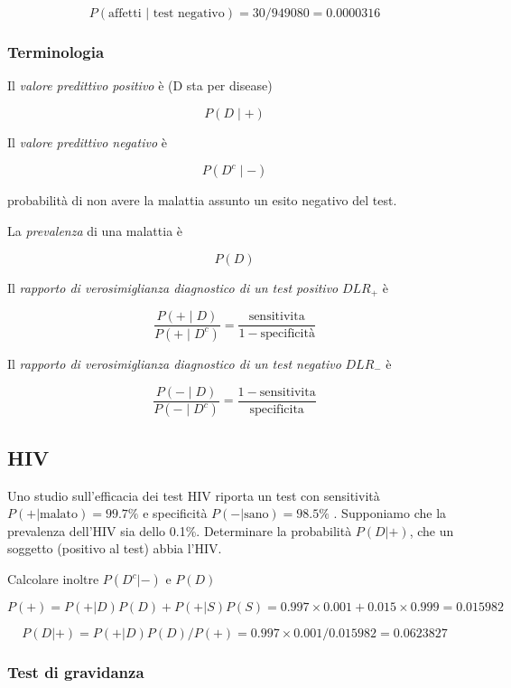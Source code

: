 \documentclass[onecolumn,12pt]{book}\usepackage[]{graphicx}\usepackage[]{color}
\begin{document}
$$P (\textrm{affetti | test negativo}) = 30/949080=0.0000316$$
        
        
        
        
\subsubsection{Terminologia}
        
Il \emph{valore predittivo positivo} è  (D sta per disease)

$$P (D \mid +)$$
        
Il \emph{valore predittivo negativo} è 

$$P (D^c \mid  -)$$
        
probabilità di non avere la malattia assunto un esito   negativo del test. 

La \emph{prevalenza} di una malattia è

$$P(D)$$
        
Il \emph{rapporto di verosimiglianza diagnostico di un test positivo} $DLR_+$ è

$$\frac{P (+\mid D)}{P(+\mid D^c)}=\frac{\textrm{sensitivita}}{1-\textrm{specificità}}$$
        
Il \emph{rapporto di  verosimiglianza diagnostico di un test negativo}   $DLR_-$  è

$$ \frac{P (-\mid D)}{P(-\mid D^c)}=\frac{1-\textrm{sensitivita}}{\textrm{specificita}}$$
        
\subsection{HIV}
        
Uno studio sull'efficacia dei test HIV riporta un test con sensitività 
$P(+|\textrm{malato})=99.7\%$ e specificità $P(-|\textrm{sano})= 98.5\%$ .
Supponiamo  che la prevalenza dell'HIV sia dello 0.1\%. 
Determinare la probabilità  $P(D|+)$, che un soggetto (positivo al test) abbia l'HIV.

Calcolare inoltre 
$P(D^c|-)$ e $P(D)$

$$P (+) =  P (+| D) P (D) + P (+| S) P (S)  =0.997\times 0.001 + 0.015\times 0.999 = 0.015982$$

$$P (D | +) = P (+| D) P (D)/P (+) = 0.997\times 0.001/0.015982 =0.0623827$$

\subsubsection{ Test di gravidanza}
\end{document}
